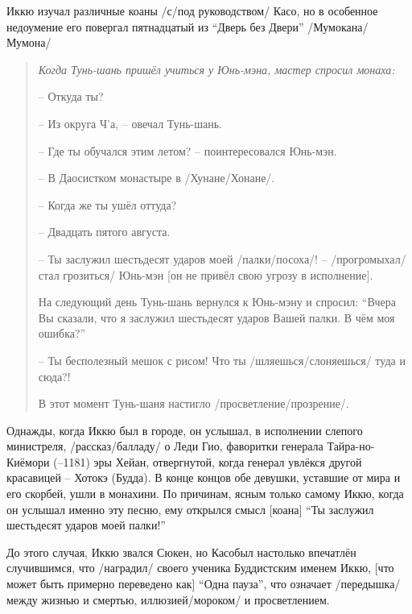 \begin{ver}
  Иккю изучал различные коаны /с/под руководством/ Касо, но в
  особенное недоумение его повергал пятнадцатый из ``Дверь без Двери''
  /Мумокана/Мумона/
  \begin{quote}\it
    Когда Тунь-шань пришёл учиться у Юнь-мэна, мастер спросил монаха:
    
    -- Откуда ты?

    -- Из округа Ч'а, -- овечал Тунь-шань.

    -- Где ты обучался этим летом? -- поинтересовался Юнь-мэн.

    -- В Даосистком монастыре в /Хунане/Хонане/.

    -- Когда же ты ушёл оттуда?

    -- Двадцать пятого августа.

    -- Ты заслужил шестьдесят ударов моей /палки/посоха/! --
    /прогромыхал/стал грозиться/ Юнь-мэн [он не привёл свою угрозу в
      исполнение]. 

    На следующий день Тунь-шань вернулся к Юнь-мэну и спросил: ``Вчера
    Вы сказали, что я заслужил шестьдесят ударов Вашей палки. В чём
    моя ошибка?''

    -- Ты бесполезный мешок с рисом! Что ты /шляешься/слоняешься/ туда и сюда?!

    В этот момент Тунь-шаня настигло /просветление/прозрение/.
  \end{quote}
\end{ver}

\begin{ver}
  Однажды, когда Иккю был в городе, он услышал, в
  исполнении слепого министреля, /рассказ/балладу/ о Леди Гио,
  фаворитки генерала Тайра-но-Киёмори (--1181) эры Хейан, отвергнутой,
  когда генерал увлёкся другой красавицей -- Хотокэ (Будда). В конце
  концов обе девушки, уставшие от мира и его скорбей, ушли в
  монахини. По причинам, ясным только самому Иккю, когда он услышал
  именно эту песню, ему открылся смысл [коана] ``Ты заслужил
  шестьдесят ударов моей палки!'' 
\end{ver}

\begin{ver}
  До этого случая, Иккю звался Сюкен, но Касобыл настолько впечатлён
  случившимся, что /наградил/ своего ученика Буддистским именем Иккю,
  [что может быть примерно переведено как] ``Одна пауза'', что
  означает /передышка/ между жизнью и смертью,
  иллюзией/мороком/ и просветлением.
\end{ver}

